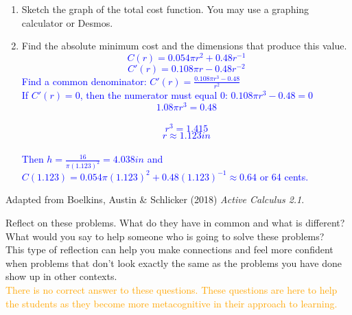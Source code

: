\documentclass{ximera}
\begin{document}
\begin{exercise}
\begin{enumerate}
        \item Sketch the graph of the total cost function.  You may use a graphing calculator or Desmos. 
          \begin{image}
          \end{image}
        \item Find the absolute minimum cost and the dimensions that produce this value.\\
        \textcolor{blue}{\[C(r)=0.054\pi r^2+0.48r^{-1}\]
        \[C'(r)=0.108\pi r-0.48r^{-2}\]
        Find a common denominator: $C'(r)=\frac{0.108\pi r^3-0.48}{r^2}$\\
        If $C'(r)=0$, then the numerator must equal 0: $0.108\pi r^3-0.48=0$\\
        \[1.08\pi r^3=0.48\]\\
        \[r^3=1.415\]
        \[r\approx 1.123in\]\\
        Then $h=\frac{16}{\pi(1.123)^2}=4.038in$ and $C(1.123)=0.054\pi (1.123)^2+0.48(1.123)^{-1}\approx 0.64$ or 64 cents.} 
    \end{enumerate}
    Adapted from Boelkins, Austin \& Schlicker (2018) \textit{Active Calculus 2.1}.
\end{exercise}

\begin{exercise}
    Reflect on these problems.  What do they have in common and what is different?  What would you say to help someone who is going to solve these problems? \\
    This type of reflection can help you make connections and feel more confident when problems that don't look exactly the same as the problems you have done show up in other contexts.\\
    \textcolor{orange}{There is no correct answer to these questions.  These questions are here to help the students as they become more metacognitive in their approach to learning.}
\end{exercise}
\end{document}
